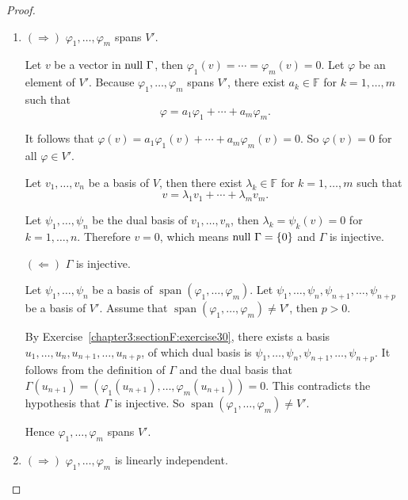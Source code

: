 \begin{proof}
    \begin{enumerate}[label={(\alph*)}]
        \item $(\Rightarrow)$ $\varphi_{1}, \ldots, \varphi_{m}$ spans $V'$.

              Let $v$ be a vector in $\operatorname{null}\,{\Gamma}$, then $\varphi_{1}(v) = \cdots = \varphi_{m}(v) = 0$. Let $\varphi$ be an element of $V'$. Because $\varphi_{1}, \ldots, \varphi_{m}$ spans $V'$, there exist $a_{k}\in \mathbb{F}$ for $k = 1,\ldots,m$ such that
              \[
                  \varphi = a_{1}\varphi_{1} + \cdots + a_{m}\varphi_{m}.
              \]

              It follows that $\varphi(v) = a_{1}\varphi_{1}(v) + \cdots + a_{m}\varphi_{m}(v) = 0$. So $\varphi(v) = 0$ for all $\varphi\in V'$.

              Let $v_{1}, \ldots, v_{n}$ be a basis of $V$, then there exist $\lambda_{k}\in\mathbb{F}$ for $k = 1,\ldots, m$ such that
              \[
                  v = \lambda_{1}v_{1} + \cdots + \lambda_{m}v_{m}.
              \]

              Let $\psi_{1}, \ldots, \psi_{n}$ be the dual basis of $v_{1}, \ldots, v_{n}$, then $\lambda_{k} = \psi_{k}(v) = 0$ for $k = 1,\ldots,n$. Therefore $v = 0$, which means $\operatorname{null}\,{\Gamma} = \{0\}$ and $\Gamma$ is injective.

              $(\Leftarrow)$ $\Gamma$ is injective.

              Let $\psi_{1}, \ldots, \psi_{n}$ be a basis of $\operatorname{span}(\varphi_{1}, \ldots, \varphi_{m})$. Let $\psi_{1}, \ldots, \psi_{n}, \psi_{n+1}, \ldots, \psi_{n+p}$ be a basis of $V'$. Assume that $\operatorname{span}(\varphi_{1}, \ldots, \varphi_{m})\ne V'$, then $p > 0$.

              By Exercise~\ref{chapter3:sectionF:exercise30}, there exists a basis $u_{1}, \ldots, u_{n}, u_{n+1}, \ldots, u_{n+p}$, of which dual basis is $\psi_{1}, \ldots, \psi_{n}, \psi_{n+1}, \ldots, \psi_{n+p}$. It follows from the definition of $\Gamma$ and the dual basis that $\Gamma(u_{n+1}) = (\varphi_{1}(u_{n+1}), \ldots, \varphi_{m}(u_{n+1})) = 0$. This contradicts the hypothesis that $\Gamma$ is injective. So $\operatorname{span}(\varphi_{1}, \ldots, \varphi_{m})\ne V'$.

              Hence $\varphi_{1}, \ldots, \varphi_{m}$ spans $V'$.
        \item $(\Rightarrow)$ $\varphi_{1}, \ldots, \varphi_{m}$ is linearly independent.


\end{enumerate}
\end{proof}
